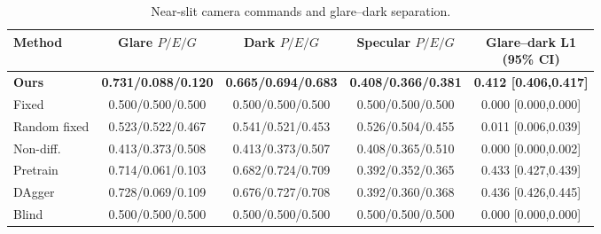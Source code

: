 \begin{table}[t]
\centering
\footnotesize
\renewcommand{\arraystretch}{1.12}
\begin{tabular*}{\textwidth}{@{\extracolsep{\fill}}lcccc@{}}
\toprule
Method & \shortstack{Glare\\$P/E/G$} & \shortstack{Dark\\$P/E/G$} & \shortstack{Specular\\$P/E/G$} & \shortstack{Glare--dark L1\\(95\% CI)} \\
\midrule
\textbf{Ours} & \textbf{0.731/0.088/0.120} & \textbf{0.665/0.694/0.683} & \textbf{0.408/0.366/0.381} & \textbf{0.412 [0.406,0.417]} \\
Fixed & 0.500/0.500/0.500 & 0.500/0.500/0.500 & 0.500/0.500/0.500 & 0.000 [0.000,0.000] \\
Random fixed & 0.523/0.522/0.467 & 0.541/0.521/0.453 & 0.526/0.504/0.455 & 0.011 [0.006,0.039] \\
Non-diff. & 0.413/0.373/0.508 & 0.413/0.373/0.507 & 0.408/0.365/0.510 & 0.000 [0.000,0.002] \\
Pretrain & 0.714/0.061/0.103 & 0.682/0.724/0.709 & 0.392/0.352/0.365 & 0.433 [0.427,0.439] \\
DAgger & 0.728/0.069/0.109 & 0.676/0.727/0.708 & 0.392/0.360/0.368 & 0.436 [0.426,0.445] \\
Blind & 0.500/0.500/0.500 & 0.500/0.500/0.500 & 0.500/0.500/0.500 & 0.000 [0.000,0.000] \\
\bottomrule
\end{tabular*}
\caption{Near-slit camera commands and glare--dark separation.}
\label{tab:journal_camera_response}
\end{table}
